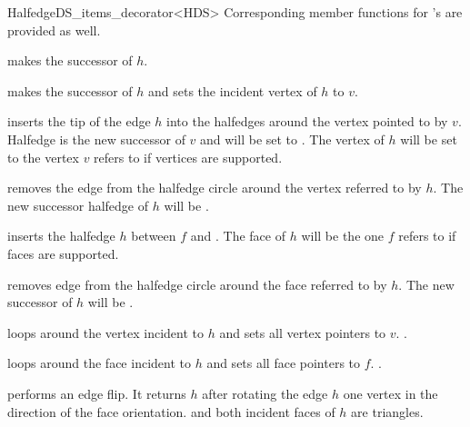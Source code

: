 \begin{ccRefClass}{HalfedgeDS_items_decorator<HDS>}
Corresponding member functions for 's are provided as well.


    {makes  the successor of $h$.}

    {makes  the successor of $h$ and sets the
    incident vertex of $h$ to $v$.}

    {inserts the tip of the edge $h$ into the halfedges around the vertex 
    pointed to by $v$. Halfedge  is the new successor of 
    $v$ and  will be set to . The vertex of $h$
    will be set to the vertex $v$ refers to if vertices are supported.}

   {removes the edge  from the halfedge
   circle around the vertex referred to by $h$. The new successor
   halfedge of $h$ will be  .}

    {inserts the halfedge $h$ between $f$ and .
    The face of $h$ will be the one $f$ refers to if faces
    are supported.}

   {removes edge  from the halfedge circle around 
    the face referred to by $h$. The new successor of $h$ will be 
    .}

\vspace*{-1mm}
   {loops around the vertex incident to $h$ and sets all vertex
    pointers to $v$. \ccPrecond {}.}

\vspace*{-1mm}
   {loops around the face incident to $h$ and sets all face 
    pointers to $f$. \ccPrecond {}.}

   {performs an edge flip. It returns $h$ after rotating the edge $h$ one
    vertex in the direction of the face orientation. 
    \ccPrecond {} and both incident faces 
    of $h$ are triangles.}


\end{ccRefClass}

